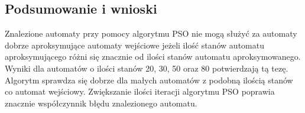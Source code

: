 \documentclass[runningheads,a4paper]{llncs}
\begin{document}
\FloatBarrier
\subsection{Podsumowanie i wnioski}

Znalezione automaty przy pomocy algorytmu PSO nie mogą służyć za automaty dobrze aproksymujące automaty wejściowe jeżeli ilość stanów automatu aproksymującego różni się znacznie od ilości stanów automatu aproksymowanego. Wyniki dla automatów o ilości stanów 20, 30, 50 oraz 80 potwierdzają tą tezę. Algorytm sprawdza się dobrze dla małych automatów z podobną ilością stanów co automat wejściowy. Zwiększanie ilości iteracji algorytmu PSO poprawia znacznie współczynnik błędu znalezionego automatu. \\
\end{document}
